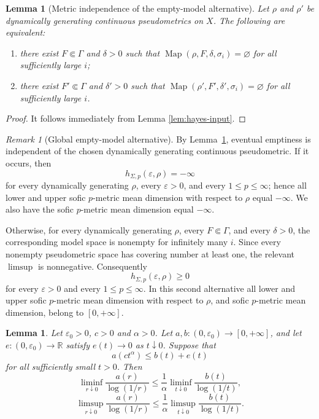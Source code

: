 \documentclass[12pt]{amsart}
\newtheorem{lemma}[theorem]{Lemma}
\theoremstyle{definition}
\theoremstyle{remark}
\newtheorem{remark}[theorem]{Remark}
\newcommand{\Map}{\operatorname{Map}}
\begin{document}
\begin{lemma}[Metric independence of the empty-model alternative]
\label{lem:empty-independent}
Let $\rho$ and $\rho'$ be dynamically generating continuous pseudometrics on $X$. The following are equivalent:
\begin{enumerate}[label=\textup{(\roman*)}]
 \item there exist $F\Subset\Gamma$ and $\delta>0$ such that
 $\Map(\rho,F,\delta,\sigma_i)=\varnothing$ for all sufficiently large $i$;
 \item there exist $F'\Subset\Gamma$ and $\delta'>0$ such that
 $\Map(\rho',F',\delta',\sigma_i)=\varnothing$ for all sufficiently large $i$.
\end{enumerate}
\end{lemma}

\begin{proof}
It follows immediately from Lemma \ref{lem:hayes-input}.
\end{proof}

\begin{remark}[Global empty-model alternative]\label{rem:empty-models}
By Lemma~\ref{lem:empty-independent}, eventual emptiness is independent of the chosen dynamically generating continuous pseudometric. If it occurs, then
\[
 h_{\Sigma,p}(\varepsilon,\rho)=-\infty
\]
for every dynamically generating $\rho$, every $\varepsilon>0$, and every $1\leq p\leq\infty$; hence all lower and  upper sofic $p$-metric mean dimension with respect to  $\rho$ equal $-\infty$. We also have the sofic $p$-metric mean dimension equal $-\infty$.

Otherwise, for every dynamically generating $\rho$, every $F\Subset\Gamma$, and every $\delta>0$, the corresponding model space is nonempty for infinitely many $i$. Since every nonempty pseudometric space has covering number at least one, the relevant $\limsup$ is nonnegative. Consequently
\[
 h_{\Sigma,p}(\varepsilon,\rho)\geq0
\]
for every $\varepsilon>0$ and every $1\leq p\leq\infty$. In this second alternative all lower and  upper sofic $p$-metric mean dimension with respect to  $\rho$, and sofic $p$-metric mean dimension, belong to $[0,+\infty]$.
\end{remark}




\begin{lemma}\label{lem:scale-change}
Let $\varepsilon_0>0$, $c>0$ and $\alpha>0$. Let $a,b:(0,\varepsilon_0)\to[0,+\infty]$, and let $e:(0,\varepsilon_0)\to\mathbb R$ satisfy $e(t)\to0$ as $t\downarrow0$. Suppose that
\[
 a(ct^\alpha)\leq b(t)+e(t)
\]
for all sufficiently small $t>0$. Then
\[
 \liminf_{r\downarrow0}\frac{a(r)}{\log(1/r)}
 \leq \frac1\alpha
 \liminf_{t\downarrow0}\frac{b(t)}{\log(1/t)},
\]
\[
 \limsup_{r\downarrow0}\frac{a(r)}{\log(1/r)}
 \leq \frac1\alpha
 \limsup_{t\downarrow0}\frac{b(t)}{\log(1/t)}.
\]
\end{lemma}
\end{document}

